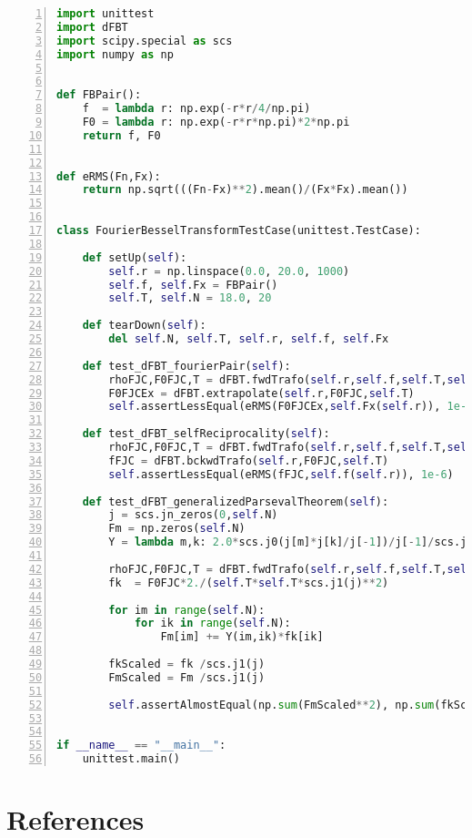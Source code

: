 \documentclass[12pt]{iopart}
\begin{document}
\begin{lstlisting}[float, floatplacement=H, numbers=left, captionpos=b,keywordstyle=\bf, frame=lines, language=Python,basicstyle=\ttfamily\scriptsize, caption={Collection of testcases contained in {\tt{python}} script file {\tt{test\_dFBT.py}}. These test are intended to assess and verify a correct function of the procedures implementing the discrete fourier bessel transform in module file {\tt{dFBT.py}}.}, label=code:unittest]
import unittest
import dFBT
import scipy.special as scs
import numpy as np


def FBPair():
    f  = lambda r: np.exp(-r*r/4/np.pi) 
    F0 = lambda r: np.exp(-r*r*np.pi)*2*np.pi     
    return f, F0


def eRMS(Fn,Fx):
    return np.sqrt(((Fn-Fx)**2).mean()/(Fx*Fx).mean())


class FourierBesselTransformTestCase(unittest.TestCase):

    def setUp(self):
        self.r = np.linspace(0.0, 20.0, 1000)
        self.f, self.Fx = FBPair()
        self.T, self.N = 18.0, 20

    def tearDown(self):
        del self.N, self.T, self.r, self.f, self.Fx

    def test_dFBT_fourierPair(self):
        rhoFJC,F0FJC,T = dFBT.fwdTrafo(self.r,self.f,self.T,self.N)
        F0FJCEx = dFBT.extrapolate(self.r,F0FJC,self.T)
        self.assertLessEqual(eRMS(F0FJCEx,self.Fx(self.r)), 1e-6)

    def test_dFBT_selfReciprocality(self): 
        rhoFJC,F0FJC,T = dFBT.fwdTrafo(self.r,self.f,self.T,self.N)
        fFJC = dFBT.bckwdTrafo(self.r,F0FJC,self.T)
        self.assertLessEqual(eRMS(fFJC,self.f(self.r)), 1e-6)

    def test_dFBT_generalizedParsevalTheorem(self):
        j = scs.jn_zeros(0,self.N)
        Fm = np.zeros(self.N)
        Y = lambda m,k: 2.0*scs.j0(j[m]*j[k]/j[-1])/j[-1]/scs.j1(j[k])**2

        rhoFJC,F0FJC,T = dFBT.fwdTrafo(self.r,self.f,self.T,self.N)
        fk  = F0FJC*2./(self.T*self.T*scs.j1(j)**2)

        for im in range(self.N):
            for ik in range(self.N):
                Fm[im] += Y(im,ik)*fk[ik]

        fkScaled = fk /scs.j1(j)
        FmScaled = Fm /scs.j1(j)

        self.assertAlmostEqual(np.sum(FmScaled**2), np.sum(fkScaled**2), 6)
            

if __name__ == "__main__":
    unittest.main()
\end{lstlisting}


\clearpage
\section*{References}

\end{document}
